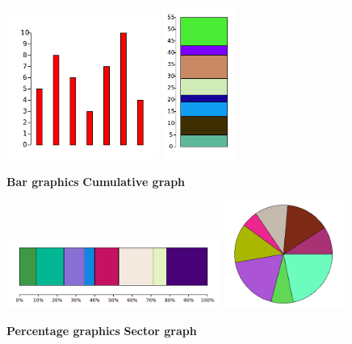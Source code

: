 \documentclass[11pt,class=report,crop=false]{standalone}
\begin{document}
\begin{activite}[Graphics]


\begin{center}
\includegraphics[scale=\myscale,width=5cm]{screen-stat-2a}\qquad\qquad
\includegraphics[scale=\myscale,height=5cm]{screen-stat-2b}

\qquad\qquad\textbf{Bar graphics}\qquad\qquad\qquad\quad
\textbf{Cumulative graph}
\end{center}

\begin{center}
\includegraphics[scale=\myscale,width=7cm]{screen-stat-2c}\qquad\qquad
\includegraphics[scale=\myscale,width=4cm]{screen-stat-2d}

\qquad\textbf{Percentage graphics}\qquad\qquad\qquad\qquad\qquad\qquad
\textbf{Sector graph}
\end{center}


\end{activite}
\end{document}
